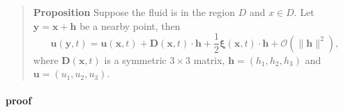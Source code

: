 \begin{quote}
	\textbf{Proposition}
Suppose the fluid is in the region $D$ and $x\in D$. Let $\textbf{y} = \textbf{x} + \textbf{h}$ be a nearby point, then
\begin{equation}
\textbf{u}(\textbf{y},t) = \textbf{u}(\textbf{x},t) + \textbf{D}(\textbf{x},t)\cdot \textbf{h} + \frac{1}{2}\mathbf{\xi}(\textbf{x},t)\cdot \textbf{h} + \mathcal{O}\left(\lVert \textbf{h}\rVert^2\right),
\end{equation}
where $\textbf{D}(\textbf{x},t)$ is a symmetric $3\times 3$ matrix, $\textbf{h}=(h_1,h_2,h_3)$ and $\textbf{u}=(u_1,u_2,u_3)$.
\end{quote}

\paragraph{proof} %

